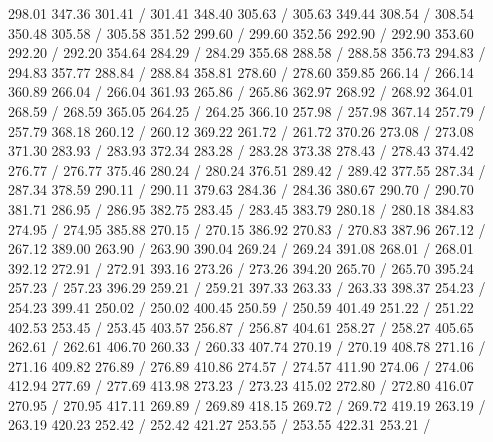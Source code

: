 { 298.01 347.36 301.41 /
 301.41 348.40 305.63 /
 305.63 349.44 308.54 /
 308.54 350.48 305.58 /
 305.58 351.52 299.60 /
 299.60 352.56 292.90 /
 292.90 353.60 292.20 /
 292.20 354.64 284.29 /
 284.29 355.68 288.58 /
 288.58 356.73 294.83 /
 294.83 357.77 288.84 /
 288.84 358.81 278.60 /
 278.60 359.85 266.14 /
 266.14 360.89 266.04 /
 266.04 361.93 265.86 /
 265.86 362.97 268.92 /
 268.92 364.01 268.59 /
 268.59 365.05 264.25 /
 264.25 366.10 257.98 /
 257.98 367.14 257.79 /
 257.79 368.18 260.12 /
 260.12 369.22 261.72 /
 261.72 370.26 273.08 /
 273.08 371.30 283.93 /
 283.93 372.34 283.28 /
 283.28 373.38 278.43 /
 278.43 374.42 276.77 /
 276.77 375.46 280.24 /
 280.24 376.51 289.42 /
 289.42 377.55 287.34 /
 287.34 378.59 290.11 /
 290.11 379.63 284.36 /
 284.36 380.67 290.70 /
 290.70 381.71 286.95 /
 286.95 382.75 283.45 /
 283.45 383.79 280.18 /
 280.18 384.83 274.95 /
 274.95 385.88 270.15 /
 270.15 386.92 270.83 /
 270.83 387.96 267.12 /
 267.12 389.00 263.90 /
 263.90 390.04 269.24 /
 269.24 391.08 268.01 /
 268.01 392.12 272.91 /
 272.91 393.16 273.26 /
 273.26 394.20 265.70 /
 265.70 395.24 257.23 /
 257.23 396.29 259.21 /
 259.21 397.33 263.33 /
 263.33 398.37 254.23 /
 254.23 399.41 250.02 /
 250.02 400.45 250.59 /
 250.59 401.49 251.22 /
 251.22 402.53 253.45 /
 253.45 403.57 256.87 /
 256.87 404.61 258.27 /
 258.27 405.65 262.61 /
 262.61 406.70 260.33 /
 260.33 407.74 270.19 /
 270.19 408.78 271.16 /
 271.16 409.82 276.89 /
 276.89 410.86 274.57 /
 274.57 411.90 274.06 /
 274.06 412.94 277.69 /
 277.69 413.98 273.23 /
 273.23 415.02 272.80 /
 272.80 416.07 270.95 /
 270.95 417.11 269.89 /
 269.89 418.15 269.72 /
 269.72 419.19 263.19 /
 263.19 420.23 252.42 /
 252.42 421.27 253.55 /
 253.55 422.31 253.21 /
}
